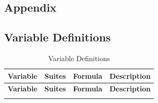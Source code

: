 \documentclass[12pt,a4paper]{article}
\begin{document}
\clearpage
\appendix
\begin{landscape}
\section{Appendix}
\label{sec:appendix}

\subsection{Variable Definitions}
\label{sec:app_vardef}

\begingroup\scriptsize
\begin{longtable}{L{3.8cm} L{1.8cm} L{8.5cm} L{8.5cm}}
\caption{Variable Definitions} \label{tab:vardef} \\
\toprule
\textbf{Variable} & \textbf{Suites} & \textbf{Formula} & \textbf{Description} \\
\midrule
\endfirsthead
\toprule
\textbf{Variable} & \textbf{Suites} & \textbf{Formula} & \textbf{Description} \\
\midrule
\endhead
\bottomrule
\endfoot


\end{longtable}
\end{landscape}
\end{document}
